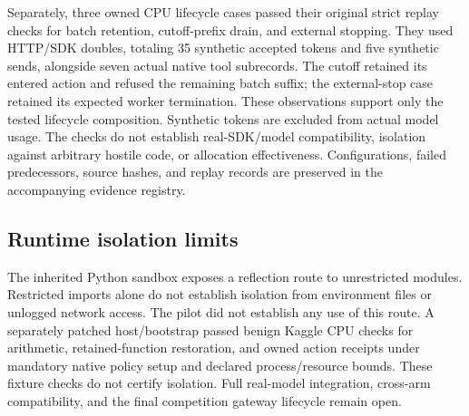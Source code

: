 \documentclass[11pt]{article}
\begin{document}
Separately, three owned CPU lifecycle cases passed their original strict replay checks for batch retention, cutoff-prefix drain, and external stopping. They used HTTP/SDK doubles, totaling 35 synthetic accepted tokens and five synthetic sends, alongside seven actual native tool subrecords. The cutoff retained its entered action and refused the remaining batch suffix; the external-stop case retained its expected worker termination. These observations support only the tested lifecycle composition. Synthetic tokens are excluded from actual model usage. The checks do not establish real-SDK/model compatibility, isolation against arbitrary hostile code, or allocation effectiveness. Configurations, failed predecessors, source hashes, and replay records are preserved in the accompanying evidence registry.

\subsection{Runtime isolation limits}
The inherited Python sandbox exposes a reflection route to unrestricted modules. Restricted imports alone do not establish isolation from environment files or unlogged network access. The pilot did not establish any use of this route. A separately patched host/bootstrap passed benign Kaggle CPU checks for arithmetic, retained-function restoration, and owned action receipts under mandatory native policy setup and declared process/resource bounds. These fixture checks do not certify isolation. Full real-model integration, cross-arm compatibility, and the final competition gateway lifecycle remain open.
\end{document}
